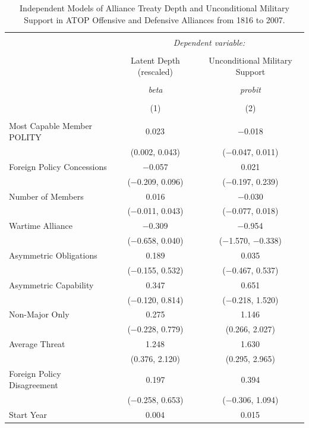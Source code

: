 \documentclass[12pt]{article}
\begin{document}
\begin{table}[!htbp] \centering 
  \caption{Independent Models of Alliance Treaty Depth and Unconditional Military Support in ATOP Offensive and Defensive Alliances from 1816 to 2007.} 
  \label{tab:separate-models} 
\begin{tabular}{@{\extracolsep{5pt}}lcc} 
\\[-1.8ex]\hline 
\hline \\[-1.8ex] 
 & \multicolumn{2}{c}{\textit{Dependent variable:}} \\ 
\cline{2-3} 
\\[-1.8ex] & Latent Depth (rescaled) & Unconditional Military Support \\ 
\\[-1.8ex] & \textit{beta} & \textit{probit} \\ 
\\[-1.8ex] & (1) & (2)\\ 
\hline \\[-1.8ex] 
  Most Capable Member POLITY & 0.023$^{}$ & $-$0.018 \\ 
  & (0.002, 0.043) & ($-$0.047, 0.011) \\ 
  Foreign Policy Concessions & $-$0.057 & 0.021 \\ 
  & ($-$0.209, 0.096) & ($-$0.197, 0.239) \\ 
  Number of Members & 0.016 & $-$0.030 \\ 
  & ($-$0.011, 0.043) & ($-$0.077, 0.018) \\ 
  Wartime Alliance & $-$0.309$^{}$ & $-$0.954$^{}$ \\ 
  & ($-$0.658, 0.040) & ($-$1.570, $-$0.338) \\ 
  Asymmetric Obligations & 0.189 & 0.035 \\ 
  & ($-$0.155, 0.532) & ($-$0.467, 0.537) \\ 
  Asymmetric Capability & 0.347 & 0.651 \\ 
  & ($-$0.120, 0.814) & ($-$0.218, 1.520) \\ 
  Non-Major Only & 0.275 & 1.146$^{}$ \\ 
  & ($-$0.228, 0.779) & (0.266, 2.027) \\ 
  Average Threat & 1.248$^{}$ & 1.630$^{}$ \\ 
  & (0.376, 2.120) & (0.295, 2.965) \\ 
  Foreign Policy Disagreement & 0.197 & 0.394 \\ 
  & ($-$0.258, 0.653) & ($-$0.306, 1.094) \\ 
  Start Year & 0.004$^{}$ & 0.015$^{}$ \\ 

\end{tabular}
\end{table}
\end{document}
